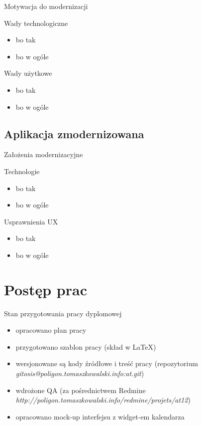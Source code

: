 \begin{frame}{Motywacja do modernizacji}
    \begin{block}{Wady technologiczne}
        \begin{itemize}
        \item bo tak
        \item bo w ogóle
        \end{itemize}
    \end{block}

    \begin{block}{Wady użytkowe}
        \begin{itemize}
        \item bo tak
        \item bo w ogóle
        \end{itemize}
    \end{block}
\end{frame}

\subsection{Aplikacja zmodernizowana}

\begin{frame}{Założenia modernizacyjne}
    \begin{block}{Technologie}
        \begin{itemize}
        \item bo tak
        \item bo w ogóle
        \end{itemize}
    \end{block}

    \begin{block}{Usprawnienia UX}
        \begin{itemize}
        \item bo tak
        \item bo w ogóle
        \end{itemize}
    \end{block}
\end{frame}

\section{Postęp prac}

\begin{frame}{Stan przygotowania pracy dyplomowej}
    \begin{itemize}
    \item opracowano plan pracy
    \item przygotowano szablon pracy (skład w \LaTeX)
    \item wersjonowane są kody źródłowe i treść pracy 
          {\footnotesize (repozytorium \textsl{gitosis@poligon.tomaszkowalski.info:at.git}) }
    \item wdrożone QA {\footnotesize (za pośrednictwem Redmine \textsl{http://poligon.tomaszkowalski.info/redmine/projets/at12}) }
    \item opracowano mock-up interfejsu z widget-em kalendarza
    \end{itemize}
\end{frame}


